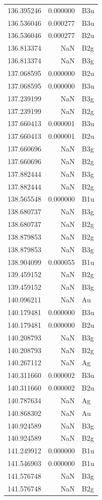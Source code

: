 \begin{longtable}{rrl}
136.395246 & 0.000000 & B3u \\
136.536046 & 0.000277 & B3u \\
136.536046 & 0.000277 & B2u \\
136.813374 & NaN & B2g \\
136.813374 & NaN & B3g \\
137.068595 & 0.000000 & B2u \\
137.068595 & 0.000000 & B3u \\
137.239199 & NaN & B3g \\
137.239199 & NaN & B2g \\
137.660413 & 0.000001 & B3u \\
137.660413 & 0.000001 & B2u \\
137.660696 & NaN & B3g \\
137.660696 & NaN & B2g \\
137.882444 & NaN & B3g \\
137.882444 & NaN & B2g \\
138.565548 & 0.000000 & B1u \\
138.680737 & NaN & B3g \\
138.680737 & NaN & B2g \\
138.879853 & NaN & B2g \\
138.879853 & NaN & B3g \\
138.904099 & 0.000055 & B1u \\
139.459152 & NaN & B2g \\
139.459152 & NaN & B3g \\
140.096211 & NaN & Au \\
140.179481 & 0.000000 & B3u \\
140.179481 & 0.000000 & B2u \\
140.208793 & NaN & B3g \\
140.208793 & NaN & B2g \\
140.267112 & NaN & Ag \\
140.311660 & 0.000002 & B3u \\
140.311660 & 0.000002 & B2u \\
140.787634 & NaN & Ag \\
140.868302 & NaN & Au \\
140.924589 & NaN & B3g \\
140.924589 & NaN & B2g \\
141.249912 & 0.000000 & B1u \\
141.546903 & 0.000000 & B1u \\
141.576748 & NaN & B3g \\
141.576748 & NaN & B2g \\

\end{longtable}
